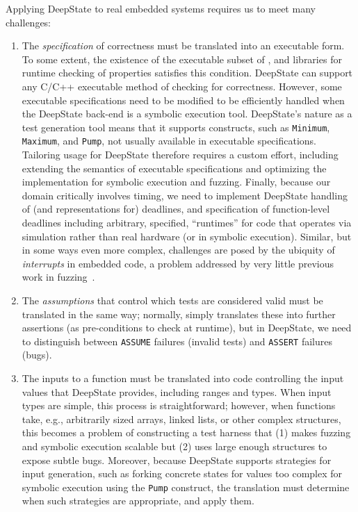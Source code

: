 Applying DeepState to real embedded systems requires us to meet many challenges:

\begin{enumerate}[labelsep=3pt,leftmargin=12pt]
\item The \emph{specification} of correctness must be translated into an executable form.  To some extent, the existence of the \eacsl executable subset of \acsl, and libraries for runtime checking of properties satisfies this condition.  DeepState can support any C/C++ executable method of checking for correctness.  However, some executable specifications need to be modified to be efficiently handled when the DeepState back-end is a symbolic execution tool.  DeepState's nature as a test generation tool means that it supports constructs, such as {\tt Minimum}, {\tt Maximum}, and {\tt Pump}, not usually available in executable specifications.  Tailoring \eacsl usage for DeepState therefore requires a custom effort, including extending the semantics of executable specifications and optimizing the implementation for symbolic execution and fuzzing.  Finally, because our domain critically involves timing, we need to implement DeepState handling of (and \eacsl representations for) deadlines, and specification of function-level deadlines including arbitrary, specified, ``runtimes'' for code that operates via simulation rather than real hardware (or in symbolic execution).  Similar, but in some ways even more complex, challenges are posed by the ubiquity of \emph{interrupts} in embedded code, a problem addressed by very little previous work in fuzzing~\cite{song2019periscope}.
\item The \emph{assumptions} that control which tests are considered valid must be translated in the same way; normally, \eacsl simply translates these into further assertions (as pre-conditions to check at runtime), but in DeepState, we need to distinguish between {\tt ASSUME} failures (invalid tests) and {\tt ASSERT} failures (bugs). 
\item The inputs to a function must be translated into code controlling the input values that DeepState provides, including ranges and types.  When input types are simple, this process is straightforward; however, when functions take, e.g., arbitrarily sized arrays, linked lists, or other complex structures, this becomes a problem of constructing a test harness that (1) makes fuzzing and symbolic execution scalable but (2) uses large enough structures to expose subtle bugs.  Moreover, because DeepState supports strategies for input generation, such as forking concrete states for values too complex for symbolic execution using the {\tt Pump} construct, the translation must determine when such strategies are appropriate, and apply them.

\end{enumerate}
